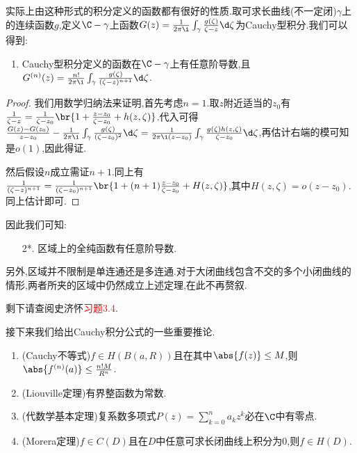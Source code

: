 \documentclass{article}
\newcommand{\exerfunc}[1]{剩下请查阅史济怀\textcolor{red}{习题#1}.}
\begin{document}
实际上由这种形式的积分定义的函数都有很好的性质.取可求长曲线(不一定闭)$\gamma$上的连续函数$g$,定义$\C-\gamma$上函数$G(z)=\frac{1}{2\pi\i}\int_\gamma\frac{g(\zeta)}{\zeta-z}\d\zeta$为Cauchy型积分.我们可以得到:
\begin{enumerate}[resume]
    \item Cauchy型积分定义的函数在$\C-\gamma$上有任意阶导数,且$G^{(n)}(z)=\frac{n!}{2\pi\i}\int_\gamma\frac{g(\zeta)}{(\zeta-z)^{n+1}}\d\zeta$.
\end{enumerate}

\begin{proof}
    我们用数学归纳法来证明,首先考虑$n=1$.取$z$附近适当的$z_0$有$\frac{1}{\zeta-z}=\frac{1}{\zeta-z_0}\br{1+\frac{z-z_0}{\zeta-z_0}+h(z,\zeta)}$.代入可得$\frac{G(z)-G(z_0)}{z-z_0}-\frac{1}{2\pi\i}\int_\gamma\frac{g(\zeta)}{(\zeta-z_0)^2}\d\zeta=\frac{1}{2\pi\i(z-z_0)}\int_\gamma\frac{g(\zeta)h(z,\zeta)}{\zeta-z_0}\d\zeta$,再估计右端的模可知是$o(1)$,因此得证.

    然后假设$n$成立需证$n+1$.同上有$\frac{1}{(\zeta-z)^{n+1}}=\frac{1}{(\zeta-z_0)^{n+1}}\br{1+(n+1)\frac{z-z_0}{\zeta-z_0}+H(z,\zeta)}$,其中$H(z,\zeta)=o(z-z_0)$.同上估计即可.
\end{proof}

因此我们可知:
\begin{enumerate}
    \item[2*.] 区域上的全纯函数有任意阶导数.
\end{enumerate}

另外,区域并不限制是单连通还是多连通.对于大闭曲线包含不交的多个小闭曲线的情形,两者所夹的区域中仍然成立上述定理,在此不再赘叙.

\exerfunc{3.4}

接下来我们给出Cauchy积分公式的一些重要推论.
\begin{enumerate}[start=3]
    \item (Cauchy不等式)$f\in H(B(a,R))$且在其中$\abs{f(z)}\leq M$,则$\abs{f^{(n)}(a)}\leq\frac{n!M}{R^n}$.
    \item (Liouville定理)有界整函数为常数.
    \item (代数学基本定理)复系数多项式$P(z)=\sum_{k=0}^n a_kz^k$必在$\C$中有零点.\\
    \item (Morera定理)$f\in C(D)$且在$D$中任意可求长闭曲线上积分为0,则$f\in H(D)$.
\end{enumerate}
\end{document}
